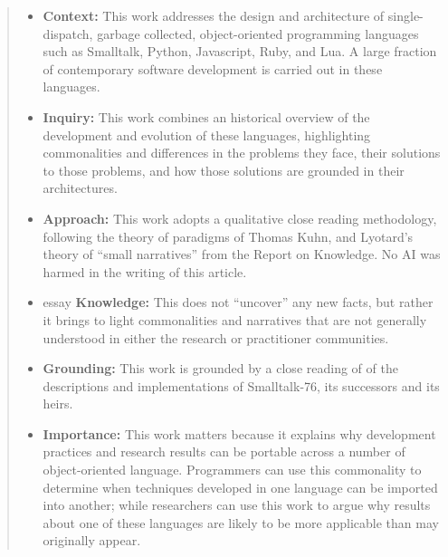 \documentclass[english,submission]{programming}
\begin{document}
\maketitle

\begin{abstract}

\begin{itemize}
\item \textbf{Context:} This work addresses the design and
  architecture of single-dispatch, garbage collected, object-oriented
  programming languages such as Smalltalk, Python, Javascript, Ruby,
  and Lua. A large fraction of contemporary software development is
  carried out in these languages.

\item \textbf{Inquiry:} This work combines an historical overview of
  the development and evolution of these languages, highlighting
  commonalities and differences in the problems they face, their
  solutions to those problems, and how those solutions are grounded in
  their architectures.
  
\item \textbf{Approach:} This work adopts a qualitative close reading
  methodology, following the theory of paradigms of Thomas Kuhn, and
  Lyotard's theory of ``small narratives'' from the Report on Knowledge.
  No AI was harmed in the writing of this article.

\item essay \textbf{Knowledge:} This does not ``uncover'' any new
  facts, but rather it brings to light commonalities and narratives
  that are not generally understood in either the research or
  practitioner communities.
  
  
\item \textbf{Grounding:} This work is grounded by a close reading of
  of the descriptions and implementations of Smalltalk-76, its
  successors and its heirs. 

\item \textbf{Importance:} This work matters because it explains why
  development practices and research results can be portable across
  a number of object-oriented language. Programmers can use this
  commonality to determine when techniques developed in one language
  can be imported into another; while researchers can use this work to
  argue why results about one of these languages are likely to be more
  applicable than may originally appear. 

\end{itemize}

  
\end{abstract} 
\end{document}
